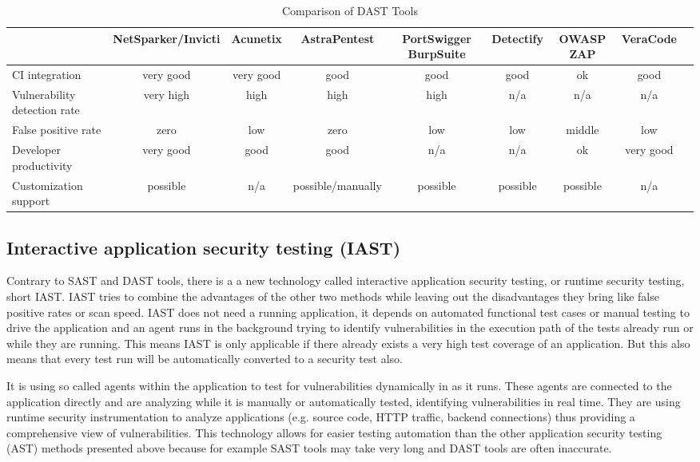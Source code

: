 \documentclass[conference]{IEEEtran}
\begin{document}
\begin{table}[h]
	\centering
	\scriptsize
	\caption{Comparison of DAST Tools}
	\begin{tabular}{l | c | c | c | c | c | c | c | c}
		\toprule
		\textbf{} & \textbf{NetSparker/Invicti}& \textbf{Acunetix} & \textbf{AstraPentest} & \textbf{PortSwigger BurpSuite} & \textbf{Detectify} & \textbf{OWASP ZAP} & \textbf{VeraCode}\\
		\hline
		\rowcolor[gray]{.9} CI integration    & very good & very good & good & good & good & ok & good \\
		Vulnerability detection rate   & very high & high  & high & high & n/a & n/a & n/a \\
		\rowcolor[gray]{.9} False positive rate & zero & low & zero & low & low & middle & low \\
		Developer productivity    & very good & good & good & n/a & n/a & ok & very good \\
		\rowcolor[gray]{.9} Customization support   &  possible   & n/a   & possible/manually  & possible & possible & possible & n/a \\
		\bottomrule
	\end{tabular}
	\label{table:comparison_dast}
\end{table}


\subsection{Interactive application security testing (IAST)}

Contrary to SAST and DAST tools, there is a a new technology called interactive application security testing, or runtime security testing, short IAST. IAST tries to combine the advantages of the other two methods while leaving out the disadvantages they bring like false positive rates or scan speed. IAST does not need a running application, it depends on automated functional test cases or manual testing to drive the application and an agent runs in the background trying to identify vulnerabilities in the execution path of the tests already run or while they are running. This means IAST is only applicable if there already exists a very high test coverage of an application. But this also means that every test run will be automatically converted to a security test also. 

It is using so called agents within the application to test for vulnerabilities dynamically in as it runs. These agents are connected to the application directly and are analyzing while it is manually or automatically tested, identifying vulnerabilities in real time. They are using runtime security instrumentation to analyze applications (e.g. source code, HTTP traffic, backend connections) thus providing a comprehensive view of vulnerabilities. This technology allows for easier testing automation than the other application security testing (AST) methods presented above because for example SAST tools may take very long and DAST tools are often inaccurate.\\
\end{document}
